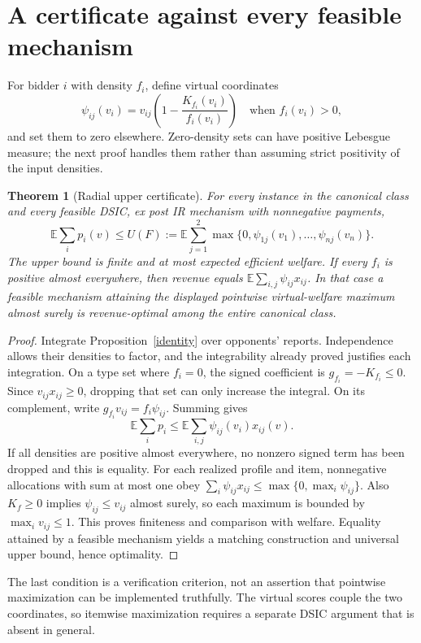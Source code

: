 \documentclass[11pt]{article}
\newtheorem{theorem}{Theorem}
\theoremstyle{definition}
\newcommand{\E}{\mathbb E}
\begin{document}
\section{A certificate against every feasible mechanism}
For bidder $i$ with density $f_i$, define virtual coordinates
\[
 \psi_{ij}(v_i)=v_{ij}\left(1-\frac{K_{f_i}(v_i)}{f_i(v_i)}\right)
 \quad\text{when }f_i(v_i)>0,
\]
and set them to zero elsewhere. Zero-density sets can have positive
Lebesgue measure; the next proof handles them rather than assuming strict
positivity of the input densities.
\begin{theorem}[Radial upper certificate]\label{certificate}
For every instance in the canonical class and every feasible DSIC, ex post
IR mechanism with nonnegative payments,
\[
 \E\sum_i p_i(v)\le
 U(F):=\E\sum_{j=1}^2\max\{0,\psi_{1j}(v_1),\ldots,\psi_{nj}(v_n)\}.
\]
The upper bound is finite and at most expected efficient welfare. If every
$f_i$ is positive almost everywhere, then revenue equals
$\E\sum_{i,j}\psi_{ij}x_{ij}$. In that case a feasible mechanism attaining
the displayed pointwise virtual-welfare maximum almost surely is
revenue-optimal among the entire canonical class.
\end{theorem}
\begin{proof}
Integrate Proposition~\ref{identity} over opponents' reports. Independence
allows their densities to factor, and the integrability already proved
justifies each integration. On a type set where $f_i=0$, the signed
coefficient is $g_{f_i}=-K_{f_i}\le0$. Since $v_{ij}x_{ij}\ge0$, dropping
that set can only increase the integral. On its complement, write
$g_{f_i}v_{ij}=f_i\psi_{ij}$. Summing gives
\[
 \E\sum_i p_i\le\E\sum_{i,j}\psi_{ij}(v_i)x_{ij}(v).
\]
If all densities are positive almost everywhere, no nonzero signed term
has been dropped and this is equality. For each realized profile and item,
nonnegative allocations with sum at most one obey
$\sum_i\psi_{ij}x_{ij}\le\max\{0,\max_i\psi_{ij}\}$.
Also $K_f\ge0$ implies $\psi_{ij}\le v_{ij}$ almost surely, so each
maximum is bounded by $\max_i v_{ij}\le1$. This proves finiteness and
comparison with welfare. Equality attained by a feasible mechanism yields
a matching construction and universal upper bound, hence optimality.
\end{proof}
The last condition is a verification criterion, not an assertion that
pointwise maximization can be implemented truthfully. The virtual scores
couple the two coordinates, so itemwise maximization requires a separate
DSIC argument that is absent in general.
\end{document}
